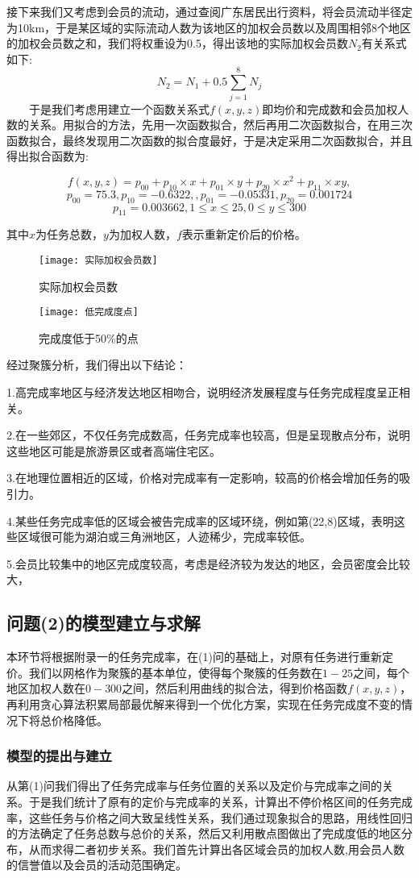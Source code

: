\documentclass{ctexart}
\begin{document}
接下来我们又考虑到会员的流动，通过查阅广东居民出行资料，将会员流动半径定为10km，于是某区域的实际流动人数为该地区的加权会员数以及周围相邻8个地区的加权会员数之和，我们将权重设为0.5，得出该地的实际加权会员数$N_2$有关系式如下:$$N_2=N_1+0.5\sum_{j=1}^{8}N_j$$
\ \ \ \ 于是我们考虑用建立一个函数关系式$f(x,y,z)$即均价和完成数和会员加权人数的关系。用拟合的方法，先用一次函数拟合，然后再用二次函数拟合，在用三次函数拟合，最终发现用二次函数的拟合度最好，于是决定采用二次函数拟合，并且得出拟合函数为:

$$f(x,y,z)=p_{00}+p_{10}\times x+ p_{01}\times y+p_{20}\times x^2+p_{11}\times xy,$$
$$p_{00} =75.3,p_{10} =-0.6322,,p_{01} =-0.05331,p_{20} =0.001724$$
$$p_{11}=0.003662,1\le x\le25,0\le y\le300$$

其中$x$为任务总数，$y$为加权人数，$f$表示重新定价后的价格。

\begin{figure}[htbp] 
\centering
\texttt{[image: 实际加权会员数]} 
\caption{实际加权会员数}
\end{figure}
\begin{figure}[htbp] 
\centering
\texttt{[image: 低完成度点]} 
\caption{完成度低于50\%的点}
\end{figure}
经过聚簇分析，我们得出以下结论：

1.高完成率地区与经济发达地区相吻合，说明经济发展程度与任务完成程度呈正相关。

2.在一些郊区，不仅任务完成数高，任务完成率也较高，但是呈现散点分布，说明这些地区可能是旅游景区或者高端住宅区。

3.在地理位置相近的区域，价格对完成率有一定影响，较高的价格会增加任务的吸引力。

4.某些任务完成率低的区域会被告完成率的区域环绕，例如第(22,8)区域，表明这些区域很可能为湖泊或三角洲地区，人迹稀少，完成率较低。

5.会员比较集中的地区完成度较高，考虑是经济较为发达的地区，会员密度会比较大，


\subsection{问题(2)的模型建立与求解}
本环节将根据附录一的任务完成率，在(1)问的基础上，对原有任务进行重新定价。我们以网格作为聚簇的基本单位，使得每个聚簇的任务数在$1-25$之间，每个地区加权人数在$0-300$之间，然后利用曲线的拟合法，得到价格函数$f(x,y,z)$，再利用贪心算法积累局部最优解来得到一个优化方案，实现在任务完成度不变的情况下将总价格降低。
\subsubsection{模型的提出与建立}
从第(1)问我们得出了任务完成率与任务位置的关系以及定价与完成率之间的关系。于是我们统计了原有的定价与完成率的关系，计算出不停价格区间的任务完成率，这些任务与价格之间大致呈线性关系，我们通过现象拟合的思路，用线性回归的方法确定了任务总数与总价的关系，然后又利用散点图做出了完成度低的地区分布，从而求得二者初步关系。我们首先计算出各区域会员的加权人数,用会员人数的信誉值以及会员的活动范围确定。
\end{document}
